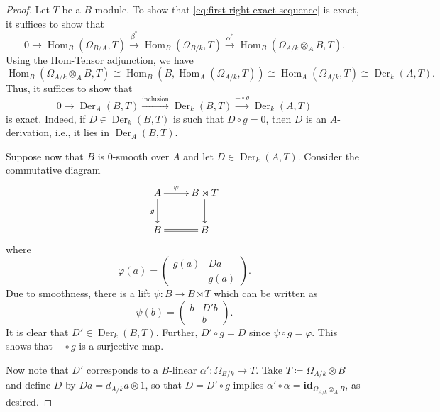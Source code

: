 \documentclass[10pt]{article}
\theoremstyle{thmstyle}
\theoremstyle{defstyle}
\newcommand{\id}{\mathbf{id}}
\newcommand{\Hom}{\operatorname{Hom}}
\newcommand{\Der}{\operatorname{Der}}
\begin{document}
\begin{proof}
    Let $T$ be a $B$-module. To show that \eqref{eq:first-right-exact-sequence} is exact, it suffices to show that 
    \begin{equation*}
        0\to\Hom_B(\Omega_{B/A}, T)\xrightarrow{\beta^\ast}\Hom_{B}(\Omega_{B/k}, T)\xrightarrow{\alpha^\ast}\Hom_B\left(\Omega_{A/k}\otimes_A B, T\right).
    \end{equation*}
    Using the Hom-Tensor adjunction, we have
    \begin{equation*}
        \Hom_B\left(\Omega_{A/k}\otimes_A B, T\right)\cong\Hom_B\left(B,\Hom_A(\Omega_{A/k}, T)\right)\cong \Hom_A(\Omega_{A/k}, T)\cong\Der_k(A, T).
    \end{equation*}
    Thus, it suffices to show that 
    \begin{equation*}
        0\to\Der_A(B, T)\xrightarrow{\text{inclusion}}\Der_k(B, T)\xrightarrow{-\circ g}\Der_k(A, T)
    \end{equation*}
    is exact. Indeed, if $D\in\Der_k(B, T)$ is such that $D\circ g = 0$, then $D$ is an $A$-derivation, i.e., it lies in $\Der_A(B, T)$.

    Suppose now that $B$ is $0$-smooth over $A$ and let $D\in\Der_k(A, T)$. Consider the commutative diagram 
    \begin{equation*}
        \xymatrix {
            A\ar[r]^-\varphi\ar[d]_g & B\rtimes T\ar[d]\\
            B\ar@{=}[r] & B
        }
    \end{equation*}
    where 
    \begin{equation*}
        \varphi(a) = 
        \begin{pmatrix}
            g(a) & Da\\
            & g(a)
        \end{pmatrix}.
    \end{equation*}
    Due to smoothness, there is a lift $\psi\colon B\to B\rtimes T$ which can be written as 
    \begin{equation*}
        \psi(b) = 
        \begin{pmatrix}
            b & D'b\\
            & b
        \end{pmatrix}.
    \end{equation*}
    It is clear that $D'\in\Der_k(B, T)$. Further, $D'\circ g = D$ since $\psi\circ g = \varphi$. This shows that $-\circ g$ is a surjective map. 
    
    Now note that $D'$ corresponds to a $B$-linear $\alpha'\colon\Omega_{B/k}\to T$. Take $T\coloneq\Omega_{A/k}\otimes B$ and define $D$ by $Da = d_{A/k}a\otimes 1$, so that $D = D'\circ g$ implies $\alpha'\circ\alpha = \id_{\Omega_{A/k}\otimes_A B}$, as desired.
\end{proof}
\end{document}
